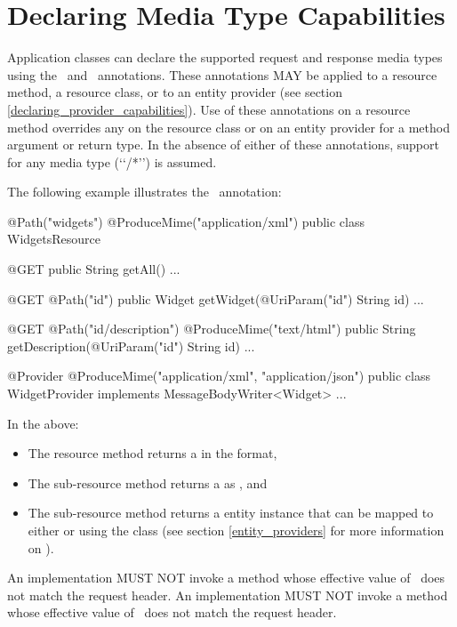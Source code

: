 \section{Declaring Media Type Capabilities}
\label{declaring_method_capabilities}

Application classes can declare the supported request and response media types using the \ProduceMime\ and \ConsumeMime\ annotations. These annotations MAY be applied to a resource method, a resource class, or to an entity provider (see section \ref{declaring_provider_capabilities}). Use of these annotations on a resource method overrides any on the resource class or on an entity provider for a method argument or return type. In the absence of either of these annotations, support for any media type (\lq\lq*/*\rq\rq) is assumed.

The following example illustrates the \ProduceMime\ annotation:

\begin{listing}{1}
@Path("widgets")
@ProduceMime("application/xml")
public class WidgetsResource {
  
  @GET
  public String getAll() {...}
  
  @GET
  @Path("{id}")
  public Widget getWidget(@UriParam("id") String id) {...}

  @GET
  @Path("{id}/description")
  @ProduceMime("text/html")
  public String getDescription(@UriParam("id") String id) {...}
}

@Provider
@ProduceMime({"application/xml", "application/json"})
public class WidgetProvider implements MessageBodyWriter<Widget> {...}
\end{listing}

In the above:
\begin{itemize}
\item The  resource method returns a  in the  format, 
\item The  sub-resource method returns a  as , and
\item The  sub-resource method returns a  entity instance that can be mapped to either  or  using the  class (see section \ref{entity_providers} for more information on \MsgWrite).
\end{itemize}

An implementation MUST NOT invoke a method whose effective value of \ProduceMime\ does not match the request  header. An implementation MUST NOT invoke a method whose effective value of \ConsumeMime\ does not match the request  header.

